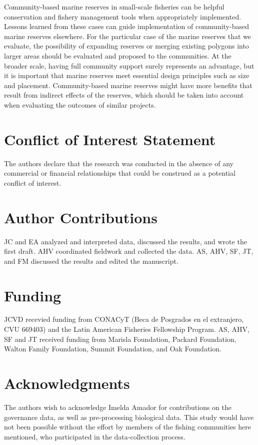 \documentclass{frontiersSCNS}
\theoremstyle{definition}
\theoremstyle{definition}
\theoremstyle{definition}
\theoremstyle{remark}
\begin{document}
Community-based marine reserves in small-scale fisheries can be helpful
conservation and fishery management tools when appropriately
implemented. Lessons learned from these cases can guide implementation
of community-based marine reserves elsewhere. For the particular case of
the marine reserves that we evaluate, the possibility of expanding
reserves or merging existing polygons into larger areas should be
evaluated and proposed to the communities. At the broader scale, having
full community support surely represents an advantage, but it is
important that marine reserves meet essential design principles such as
size and placement. Community-based marine reserves might have more
benefits that result from indirect effects of the reserves, which should
be taken into account when evaluating the outcomes of similar projects.

\section*{Conflict of Interest Statement}

The authors declare that the research was conducted in the absence of
any commercial or financial relationships that could be construed as a
potential conflict of interest.

\section*{Author Contributions}

JC and EA analyzed and interpreted data, discussed the results, and
wrote the first draft. AHV coordinated fieldwork and collected the data.
AS, AHV, SF, JT, and FM discussed the results and edited the manuscript.

\section*{Funding}

JCVD recevied funding from CONACyT (Beca de Posgrados en el extranjero,
CVU 669403) and the Latin American Fisheries Fellowship Program. AS,
AHV, SF and JT received funding from Marisla Foundation, Packard
Foundation, Walton Family Foundation, Summit Foundation, and Oak
Foundation.

\section*{Acknowledgments}

The authors wish to acknowledge Imelda Amador for contributions on the
governance data, as well as pre-processing biological data. This study
would have not been possible without the effort by members of the
fishing communities here mentioned, who participated in the
data-collection process.
\end{document}
